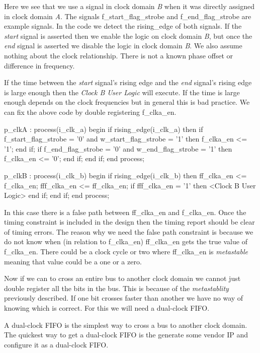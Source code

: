 Here we see that we use a signal in clock domain \emph{B} when it was directly assigned in clock domain \emph{A}. The signals f\_start\_flag\_strobe and f\_end\_flag\_strobe are example signals. In the code we detect the rising\_edge of both signals. If the \emph{start} signal is asserted then we enable the logic on clock domain \emph{B}, but once the \emph{end} signal is asserted we disable the logic in clock domain \emph{B}. We also assume nothing about the clock relationship. There is not a known phase offset or difference in frequency. 

If the time between the \emph{start} signal's rising edge and the \emph{end} signal's rising edge is large enough then the \emph{Clock B User Logic} will execute. If the time is large enough depends on the clock frequencies but in general this is bad practice. We can fix the above code by double registering f\_clka\_en. 

\begin{VHDLlisting}[tabsize=4]
p_clkA : process(i_clk_a)
begin
    if rising_edge(i_clk_a) then
        if f_start_flag_strobe = '0' and w_start_flag_strobe = '1' then
            f_clka_en <= '1';
        end if;
        if f_end_flag_strobe = '0' and w_end_flag_strobe = '1' then
            f_clka_en <= '0';
        end if;
    end if;
end process;

p_clkB : process(i_clk_b)
begin
    if rising_edge(i_clk_b) then
        ff_clka_en <= f_clka_en;
        fff_clka_en <= ff_clka_en;
        if fff_clka_en = '1' then
            <Clock B User Logic>
        end if;
    end if;
end process;
\end{VHDLlisting}	

In this case there is a false path between ff\_clka\_en and f\_clka\_en. Once the timing constraint is included in the design then the timing report should be clear of timing errors. The reason why we need the false path constraint is because we do not know when (in relation to f\_clka\_en) ff\_clka\_en gets the true value of f\_clka\_en. There could be a clock cycle or two where ff\_clka\_en is \emph{metastable} meaning that value could be a one or a zero. 

Now if we can to cross an entire bus to another clock domain we cannot just double register all the bits in the bus. This is because of the \emph{metastablity} previously described. If one bit crosses faster than another we have no way of knowing which is correct. For this we will need a dual-clock \ac{FIFO}. 

A dual-clock \ac{FIFO} is the simplest way to cross a bus to another clock domain. The quickest way to get a dual-clock \ac{FIFO} is the generate some vendor \ac{IP} and configure it as a dual-clock \ac{FIFO}. 

